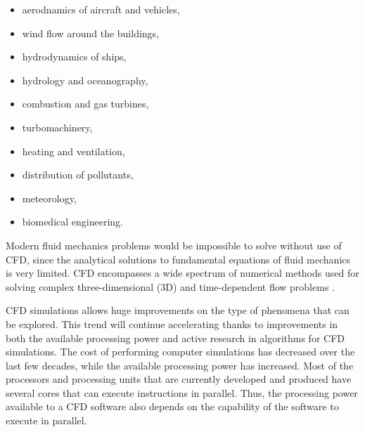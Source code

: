 \begin{itemize}
	\item aerodnamics of aircraft and vehicles,
	\item wind flow around the buildings,
	\item hydrodynamics of ships,
	\item hydrology and oceanography,
	\item combustion and gas turbines,
	\item turbomachinery,
	\item heating and ventilation,
	\item distribution of pollutants,
	\item meteorology,
	\item biomedical engineering.
\end{itemize}

Modern fluid mechanics problems would be impossible to solve without use of CFD, since the analytical solutions to fundamental equations of fluid mechanics is very limited. CFD encompasses a wide spectrum of numerical methods used for solving complex three-dimensional (3D) and time-dependent flow problems \cite{rapp2017}. 

CFD simulations allows huge improvements on the type of phenomena that can be explored. This trend will continue accelerating thanks to improvements in both the available processing power and active research in algorithms for CFD simulations. The cost of performing computer simulations has decreased over the last few decades, while the available processing power has increased. Most of the processors and processing units that are currently developed and produced have several cores that can execute instructions in parallel. Thus, the processing power available to a CFD software also depends on the capability of the software to execute in parallel.



